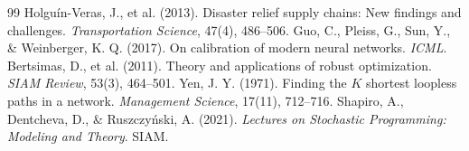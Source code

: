 \documentclass[11pt,a4paper]{article}
\begin{document}

\begin{thebibliography}{99}
 Holgu\'in-Veras, J., et al. (2013). Disaster relief supply chains: New findings and challenges. \textit{Transportation Science}, 47(4), 486--506.
 Guo, C., Pleiss, G., Sun, Y., \& Weinberger, K. Q. (2017). On calibration of modern neural networks. \textit{ICML}.
 Bertsimas, D., et al. (2011). Theory and applications of robust optimization. \textit{SIAM Review}, 53(3), 464--501.
 Yen, J. Y. (1971). Finding the $K$ shortest loopless paths in a network. \textit{Management Science}, 17(11), 712--716.
 Shapiro, A., Dentcheva, D., \& Ruszczy\'nski, A. (2021). \textit{Lectures on Stochastic Programming: Modeling and Theory}. SIAM.
\end{thebibliography}
\end{document}
